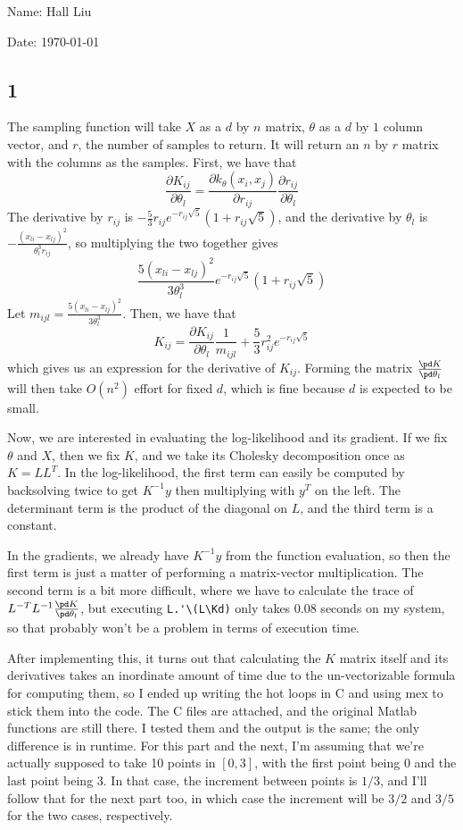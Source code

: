 \documentclass{article}
\begin{document}
Name: Hall Liu

Date: \today 
\vspace{1.5cm}
\subsection*{1}
The sampling function will take $X$ as a $d$ by $n$ matrix, $\theta$ as a $d$ by $1$ column vector, and $r$, the number of samples to return. It will return an $n$ by $r$ matrix with the columns as the samples.
First, we have that 
\[\frac{\partial K_{ij}}{\partial \theta_l}=\frac{\partial k_\theta(x_i, x_j)}{\partial r_{ij}}\frac{\partial r_{ij}}{\partial \theta_l}\]
The derivative by $r_{ij}$ is $-\frac{5}{3}r_{ij}e^{-r_{ij}\sqrt{5}}(1+r_{ij}\sqrt{5})$, and the derivative by $\theta_l$ is $-\frac{(x_{li}-x_{lj})^2}{\theta_l^3r_{ij}}$, so multiplying the two together gives
\[\frac{5(x_{li}-x_{lj})^2}{3\theta_l^3}e^{-r_{ij}\sqrt{5}}(1+r_{ij}\sqrt{5})\]
Let $m_{ijl}=\frac{5(x_{li}-x_{lj})^2}{3\theta_l^3}$. Then, we have that
\[K_{ij}=\frac{\partial K_{ij}}{\partial \theta_l}\frac{1}{m_{ijl}}+\frac{5}{3}r_{ij}^2e^{-r_{ij}\sqrt{5}}\]
which gives us an expression for the derivative of $K_{ij}$. Forming the matrix $\frac{\pd K}{\pd \theta_l}$ will then take $O(n^2)$ effort for fixed $d$, which is fine because $d$ is expected to be small.

Now, we are interested in evaluating the log-likelihood and its gradient. If we fix $\theta$ and $X$, then we fix $K$, and we take its Cholesky decomposition once as $K=LL^T$. In the log-likelihood, the first term can easily be computed by backsolving twice to get $K^{-1}y$ then multiplying with $y^T$ on the left. The determinant term is the product of the diagonal on $L$, and the third term is a constant. 

In the gradients, we already have $K^{-1}y$ from the function evaluation, so then the first term is just a matter of performing a matrix-vector multiplication. The second term is a bit more difficult, where we have to calculate the trace of $L^{-T}L^{-1}\frac{\pd K}{\pd\theta_l}$, but executing \verb|L.'\(L\Kd)| only takes $0.08$ seconds on my system, so that probably won't be a problem in terms of execution time. 

After implementing this, it turns out that calculating the $K$ matrix itself and its derivatives takes an inordinate amount of time due to the un-vectorizable formula for computing them, so I ended up writing the hot loops in C and using mex to stick them into the code. The C files are attached, and the original Matlab functions are still there. I tested them and the output is the same; the only difference is in runtime.
For this part and the next, I'm assuming that we're actually supposed to take 10 points in $[0,3]$, with the first point being 0 and the last point being 3. In that case, the increment between points is $1/3$, and I'll follow that for the next part too, in which case the increment will be $3/2$ and $3/5$ for the two cases, respectively.
\end{document}
